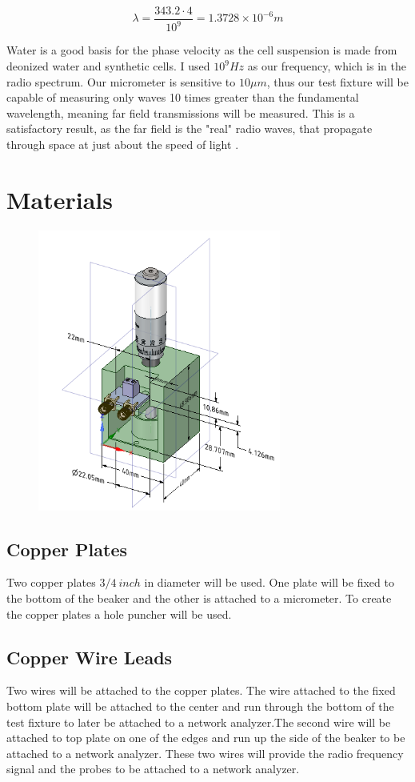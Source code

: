 \documentclass[journal]{IEEEtran}
\begin{document}
\begin{equation}
\label{near-wavelength-water}
\lambda = \frac{343.2 \cdot 4}{10^9} = 1.3728 \times 10^{-6} m
\end{equation}

Water is a good basis for the phase velocity as the cell suspension is made from deonized water and synthetic cells. I used $10^9 Hz$ as our frequency, which is in the radio spectrum. Our micrometer is sensitive to $10\mu m$, thus our test fixture will be capable of measuring only waves 10 times greater than the fundamental wavelength, meaning far field transmissions will be measured. This is a satisfactory result, as the far field is the "real" radio waves, that propagate through space at just about the speed of light \cite{near-far-em}. 

\section{Materials}

\begin{figure}[h]
\label{test-fixture}
\includegraphics[width=8cm]{Combined_Test_Fixture.png}
\end{figure}

\subsection{Copper Plates}
Two copper plates $3/4 \: inch$ in diameter will be used. One plate will be fixed to the bottom of the beaker and the other is attached to a micrometer. To create the copper plates a hole puncher will be used.

\subsection{Copper Wire Leads}
Two wires will be attached to the copper plates. The wire attached to the fixed bottom plate will be attached to the center and run through the bottom of the test fixture to later be attached to a network analyzer.The second wire will be attached to top plate on one of the edges and run up the side of the beaker to be attached to a network analyzer. These two wires will provide the radio frequency signal and the probes to be attached to a network analyzer.
\end{document}
